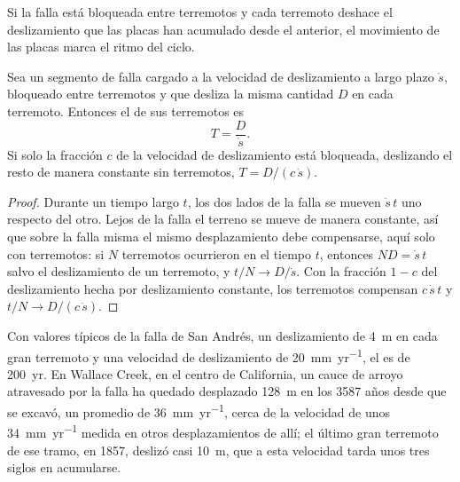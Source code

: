 Si la falla está bloqueada entre terremotos y cada terremoto deshace el deslizamiento que las placas han acumulado desde el anterior,
el movimiento de las placas marca el ritmo del ciclo.

\begin{proposition}\label{prop:b1:earthquake-source:recurrence}
Sea un segmento de falla cargado a la velocidad de deslizamiento a largo plazo $\dot s$, bloqueado entre terremotos y que desliza la
misma cantidad $D$ en cada terremoto. Entonces el  de sus terremotos es
\[
  T = \frac{D}{\dot s} .
\]
Si solo la fracción $c$ de la velocidad de deslizamiento está bloqueada, deslizando el resto de manera constante sin terremotos,
$T = D/(c\,\dot s)$.
\end{proposition}

\begin{proof}
Durante un tiempo largo $t$, los dos lados de la falla se mueven $\dot s\,t$ uno respecto del otro. Lejos de la falla el terreno se mueve
de manera constante, así que sobre la falla misma el mismo desplazamiento debe compensarse, aquí solo con terremotos: si $N$ terremotos
ocurrieron en el tiempo $t$, entonces $N D = \dot s\,t$ salvo el deslizamiento de un terremoto, y $t/N \to D/\dot s$. Con la fracción
$1-c$ del deslizamiento hecha por deslizamiento constante, los terremotos compensan $c\,\dot s\,t$ y $t/N \to D/(c\,\dot s)$.
\end{proof}

Con valores típicos de la falla de San Andrés, un deslizamiento de \qty{4}{m} en cada gran terremoto y una velocidad de deslizamiento de
\qty{20}{mm.yr^{-1}}, el  es de \qty{200}{yr}. En Wallace Creek, en el centro de California, un cauce de arroyo
atravesado por la falla ha quedado desplazado \qty{128}{m} en los \num{3587} años desde que se excavó, un promedio de \qty{36}{mm.yr^{-1}},
cerca de la velocidad de unos \qty{34}{mm.yr^{-1}} medida en otros desplazamientos de allí; el último gran terremoto de ese tramo, en 1857,
deslizó casi \qty{10}{m}, que a esta velocidad tarda unos tres siglos en acumularse.

